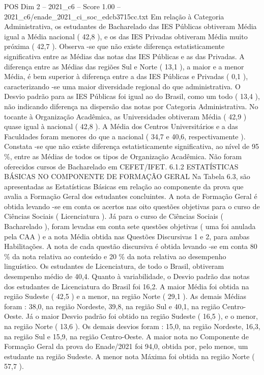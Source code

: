 \begin{textsample}{POS Dim 2 – 2021\_c6 – Score 1.00 – 2021\_c6/enade\_2021\_ci\_soc\_edcb3715cc.txt}
Em relação à Categoria Administrativa, os estudantes de Bacharelado das IES Públicas obtiveram Média igual a Média nacional ( 42,8 ), e os das IES Privadas obtiveram Média muito próxima ( 42,7 ).
Observa -se que não existe diferença estatisticamente significativa entre as Médias das notas das IES Públicas e as das Privadas.
A diferença entre as Médias das regiões Sul e Norte ( 13,1 ), a maior e a menor Média, é bem superior à diferença entre a das IES Públicas e Privadas ( 0,1 ), caracterizando -se uma maior diversidade regional do que administrativa.
O Desvio padrão para as IES Públicas foi igual ao do Brasil, como um todo ( 13,4 ), não indicando diferença na dispersão das notas por Categoria Administrativa.
No tocante à Organização Acadêmica, as Universidades obtiveram Média ( 42,9 ) quase igual à nacional ( 42,8 ).
A Média dos Centros Universitários e a das Faculdades foram menores do que a nacional ( 34,7 e 40,6, respectivamente ).
Constata -se que não existe diferença estatisticamente significativa, ao nível de 95 \%, entre as Médias de todos os tipos de Organização Acadêmica.
Não foram oferecidos cursos de Bacharelado em CEFET/IFET. 6.1.2 ESTATÍSTICAS BÁSICAS NO COMPONENTE DE FORMAÇÃO GERAL Na Tabela 6.3, são apresentadas as Estatísticas Básicas em relação ao componente da prova que avalia a Formação Geral dos estudantes concluintes.
A nota de Formação Geral é obtida levando -se em conta os acertos nas oito questões objetivas para o curso de Ciências Sociais ( Licenciatura ).
Já para o curso de Ciências Sociais ( Bacharelado ), foram levadas em conta sete questões objetivas ( uma foi anulada pela CAA ) e a nota Média obtida nas Questões Discursivas 1 e 2, para ambas Habilitações.
A nota de cada questão discursiva é obtida levando -se em conta 80 \% da nota relativa ao conteúdo e 20 \% da nota relativa ao desempenho linguístico.
Os estudantes de Licenciatura, de todo o Brasil, obtiveram desempenho médio de 40,4.
Quanto à variabilidade, o Desvio padrão das notas dos estudantes de Licenciatura do Brasil foi 16,2.
A maior Média foi obtida na região Sudeste ( 42,5 ) e a menor, na região Norte ( 29,1 ).
As demais Médias foram : 38,0, na região Nordeste, 39,8, na região Sul e 40,1, na região Centro-Oeste.
Já o maior Desvio padrão foi obtido na região Sudeste ( 16,5 ), e o menor, na região Norte ( 13,6 ).
Os demais desvios foram : 15,0, na região Nordeste, 16,3, na região Sul e 15,9, na região Centro-Oeste.
A maior nota no Componente de Formação Geral da prova do Enade/2021 foi 94,0, obtida por, pelo menos, um estudante na região Sudeste.
A menor nota Máxima foi obtida na região Norte ( 57,7 ).

\end{textsample}
